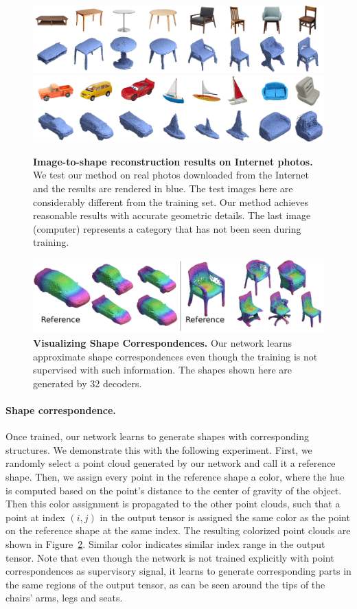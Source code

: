 \begin{figure}[t]
\centering
\includegraphics[width=0.9\linewidth]{dmp/imgs/furniture.pdf}
\includegraphics[width=0.9\linewidth]{dmp/imgs/toys.pdf}
	\caption{\label{fig:toy} \small
	\textbf{Image-to-shape reconstruction results on Internet photos.} We test our method on real photos downloaded from the Internet and the results are rendered in blue. 
    The test images here are considerably different from the training set. Our method achieves reasonable results with accurate geometric details. The last image (computer) represents a category that has not been seen during training.
    }
\end{figure}

\begin{figure}[h!]
\centering
\includegraphics[width=0.8\linewidth]{dmp/imgs/corresp.pdf}
	\caption{\label{fig:corresp} \small
	\textbf{Visualizing Shape Correspondences.}
	Our network learns approximate shape correspondences even though the training is not supervised with such information. The shapes shown here are generated by 32 decoders.
	}
\end{figure}

\paragraph*{Shape correspondence.} Once trained, our network learns to generate shapes with corresponding structures.
We demonstrate this with the following experiment.
First, we randomly select a point cloud generated by our network and call it a reference shape.
Then, we assign every point in the reference shape a color, where the hue is computed based on the point's distance to the center of gravity of the object.
Then this color assignment is propagated to the other point clouds, such that a point at index $(i,j)$ in the output tensor is assigned the same color as the point on the reference shape at the same index.
The resulting colorized point clouds are shown in Figure~\ref{fig:corresp}. Similar color indicates similar index range in the output tensor.
Note that even though the network is not trained explicitly with point correspondences as
supervisory signal, it learns to generate corresponding parts in the same
regions of the output tensor, as can be seen around
the tips of the chairs' arms,  legs and  seats.


